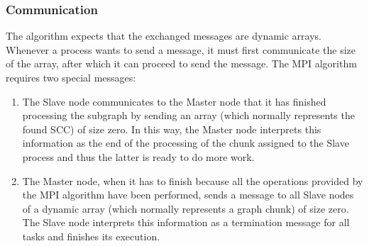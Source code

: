 \subsubsection{Communication}
The algorithm expects that the exchanged messages are dynamic arrays. Whenever a process wants to send a message, it must first communicate the size of the array, after which it can proceed to send the message. 
The MPI algorithm requires two special messages:
\begin{enumerate}
    \item The Slave node communicates to the Master node that it has finished processing the subgraph by sending an array (which normally represents the found SCC) of size zero. In this way, the Master node interprets this information as the end of the processing of the chunk assigned to the Slave process and thus the latter is ready to do more work.
    \item The Master node, when it has to finish because all the operations provided by the MPI algorithm have been performed, sends a message to all Slave nodes of a dynamic array (which normally represents a graph chunk) of size zero. The Slave node interprets this information as a termination message for all tasks and finishes its execution.     
\end{enumerate}




